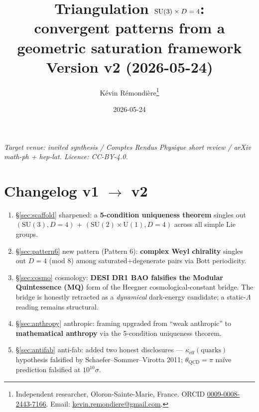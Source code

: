 \documentclass[11pt,a4paper]{article}
\title{Triangulation $\SU(3) \times D = 4$:\\
convergent patterns from a geometric saturation framework\\
\large\bfseries Version v2 (2026-05-24)}
\author{Kévin Rémondière\thanks{Independent researcher, Oloron-Sainte-Marie, France.
ORCID \href{https://orcid.org/0009-0008-2443-7166}{0009-0008-2443-7166}.
Email: \href{mailto:kevin.remondiere@gmail.com}{kevin.remondiere@gmail.com}.}}
\date{2026-05-24}
\newcommand{\SU}{\mathrm{SU}}
\newcommand{\Uone}{\mathrm{U}(1)}
\begin{document}
\maketitle

\begin{center}
\textit{Target venue: invited synthesis / Comptes Rendus Physique short review / arXiv math-ph + hep-lat. Licence: CC-BY-4.0.}
\end{center}

\section*{Changelog v1 $\to$ v2}

\begin{enumerate}[leftmargin=*,itemsep=2pt]
  \item \S\ref{sec:scaffold} sharpened: a \textbf{5-condition uniqueness theorem} singles out $(\SU(3), D = 4)$ + $(\SU(2) \times \Uone, D = 4)$ across all simple Lie groups.
  \item \S\ref{sec:pattern6} new pattern (Pattern 6): \textbf{complex Weyl chirality} singles out $D = 4$ (mod 8) among saturated+degenerate pairs via Bott periodicity.
  \item \S\ref{sec:cosmo} cosmology: \textbf{DESI DR1 BAO falsifies the Modular Quintessence (MQ)} form of the Heegner cosmological-constant bridge. The bridge is honestly retracted as a \emph{dynamical} dark-energy candidate; a static-$\Lambda$ reading remains structural.
  \item \S\ref{sec:anthropy} anthropic: framing upgraded from ``weak anthropic'' to \textbf{mathematical anthropy} via the 5-condition uniqueness theorem.
  \item \S\ref{sec:antifab} anti-fab: added two honest disclosures --- $\kappa_\mathrm{eff}(\text{quarks})$ hypothesis falsified by Schaefer--Sommer--Virotta 2011; $\theta_\mathrm{QCD} = \pi$ naïve prediction falsified at $10^{10}\sigma$.
\end{enumerate}
\end{document}

